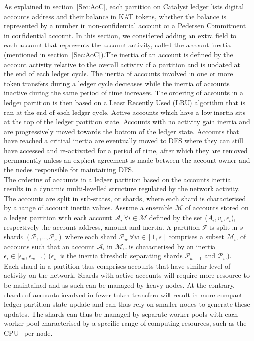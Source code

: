 As explained in section~\ref{Sec:AoC}, each partition on Catalyst ledger lists digital accounts address and their balance in KAT tokens, whether the balance is represented by a number in non-confidential account or a Pedersen Commitment in confidential account. In this section, we considered adding an extra field to each account that represents the account activity, called the account inertia (mentioned in section~\ref{Sec:AoC}).The inertia of an account is defined by the account activity relative to the overall activity of a partition and is updated at the end of each ledger cycle. The inertia of accounts involved in one or more token transfers during a ledger cycle decreases while the inertia of accounts inactive during the same period of time increases. The ordering of accounts in a ledger partition is then based on a Least Recently Used (LRU) algorithm that is ran at the end of each ledger cycle. Active accounts which have a low inertia sits at the top of the ledger partition state. Accounts with no activity gain inertia and are progressively moved towards the bottom of the ledger state. Accounts that have reached a critical inertia are eventually moved to DFS where they can still have accessed and re-activated for a period of time, after which they are removed permanently unless an explicit agreement is made between the account owner and the nodes responsible for maintaining DFS. \\

The ordering of accounts in a ledger partition based on the accounts inertia results in a dynamic multi-levelled structure regulated by the network activity. The accounts are split in sub-states, or shards, where each shard is characterised by a range of account inertia values. Assume a ensemble $\mathcal{M}$ of accounts stored on a ledger partition with each account $\mathcal{A}_i~\forall i \in \mathcal{M}$ defined by the set ($A_i, v_i, \epsilon_i$), respectively the account address, amount and inertia. A partition $\mathcal{P}$ is split in $s$ shards $(\mathcal{P}_1,..,\mathcal{P}_s)$ where each shard $\mathcal{P}_w~\forall w \in [1,s]$ comprises a subset $\mathcal{M}_w$ of accounts such that an account $\mathcal{A}_i$ in $\mathcal{M}_w$ is characterised by an inertia $\epsilon_i \in [\epsilon_w, \epsilon_{w+1})$ ($\epsilon_w$ is the inertia threshold separating shards $\mathcal{P}_{w-1}$ and $\mathcal{P}_{w}$).\\ 

Each shard in a partition thus comprises accounts that have similar level of activity on the network. Shards with active accounts will require more resource to be maintained and as such can be managed by heavy nodes. At the contrary, shards of accounts involved in fewer token transfers will result in more compact ledger partition state update and can thus rely on smaller nodes to generate these updates. The shards can thus be managed by separate worker pools with each worker pool characterised by a specific range of computing resources, such as the CPU~\cite{coremark} per node. \\

